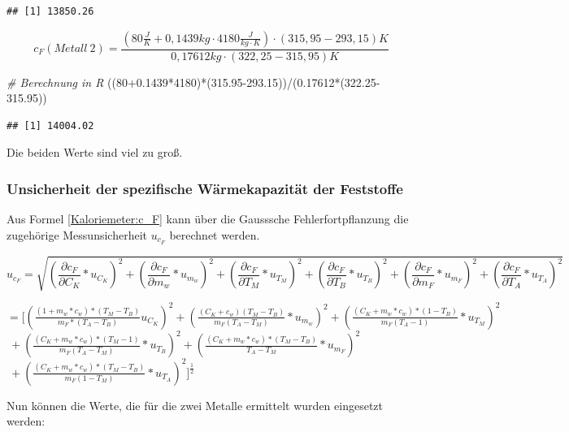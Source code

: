 \documentclass[
  9pt,
]{article}
\newenvironment{Shaded}{\begin{snugshade}}{\end{snugshade}}
\newcommand{\CommentTok}[1]{\textcolor[rgb]{0.56,0.35,0.01}{\textit{#1}}}
\newcommand{\DecValTok}[1]{\textcolor[rgb]{0.00,0.00,0.81}{#1}}
\newcommand{\FloatTok}[1]{\textcolor[rgb]{0.00,0.00,0.81}{#1}}
\newcommand{\NormalTok}[1]{#1}
\newcommand{\SpecialCharTok}[1]{\textcolor[rgb]{0.00,0.00,0.00}{#1}}
\begin{document}
\begin{verbatim}
## [1] 13850.26
\end{verbatim}

\[c_F(Metall\ 2) = \frac{(80\frac{J}{K}+0,1439kg\cdot 4180\frac{J}{kg\cdot K})\cdot (315,95-293,15)K}{0,17612kg\cdot(322,25-315,95)K}\]

\begin{Shaded}
\begin{Highlighting}[]
\CommentTok{\# Berechnung in R}
\NormalTok{((}\DecValTok{80}\FloatTok{+0.1439}\SpecialCharTok{*}\DecValTok{4180}\NormalTok{)}\SpecialCharTok{*}\NormalTok{(}\FloatTok{315.95{-}293.15}\NormalTok{))}\SpecialCharTok{/}\NormalTok{(}\FloatTok{0.17612}\SpecialCharTok{*}\NormalTok{(}\FloatTok{322.25{-}315.95}\NormalTok{))}
\end{Highlighting}
\end{Shaded}

\begin{verbatim}
## [1] 14004.02
\end{verbatim}

Die beiden Werte sind viel zu groß.

\hypertarget{unsicherheit-der-spezifische-wuxe4rmekapazituxe4t-der-feststoffe}{%
\subsubsection{Unsicherheit der spezifische Wärmekapazität der
Feststoffe}\label{unsicherheit-der-spezifische-wuxe4rmekapazituxe4t-der-feststoffe}}

Aus Formel \ref{Kaloriemeter:c_F} kann über die Gausssche
Fehlerfortpflanzung die zugehörige Messunsicherheit \(u_{c_F}\)
berechnet werden.

\[u_{c_F}=\sqrt{(\frac{\partial c_F}{\partial C_K}*u_{C_K})^2+(\frac{\partial c_F}{\partial m_w}*u_{m_w})^2+(\frac{\partial c_F}{\partial T_M}*u_{T_M})^2+ (\frac{\partial c_F}{\partial T_B}*u_{T_B})^2+ (\frac{\partial c_F}{\partial m_F}*u_{m_F})^2+ (\frac{\partial c_F}{\partial T_A}*u_{T_A})^2}\]

\(=[(\frac{(1+m_w*c_w)*(T_M-T_B)}{m_F*(T_A-T_B)}u_{C_K})^2+(\frac{(C_K+c_w)(T_M-T_B)}{m_F(T_A-T_M)}*u_{m_w})^2+(\frac{(C_K+m_w*c_w)*(1-T_B)}{m_F(T_A-1)}*u_{T_M})^2\)
\(\ +(\frac{(C_K+m_w*c_w)*(T_M-1)}{m_F(T_A-T_M)}*u_{T_B})^2+(\frac{(C_K+m_w*c_w)*(T_M-T_B)}{T_A-T_M}*u_{m_F})^2\)
\(\ +(\frac{(C_K+m_w*c_w)*(T_M-T_B)}{m_F(1-T_M)}*u_{T_A})^2]^{\frac{1}{2}}\)

Nun können die Werte, die für die zwei Metalle ermittelt wurden
eingesetzt werden:
\end{document}
